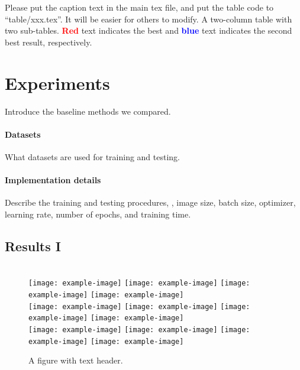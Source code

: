 \begin{table*}[t] \centering
    \newcommand{\Frst}[1]{\textcolor{red}{\textbf{#1}}}
    \newcommand{\Scnd}[1]{\textcolor{blue}{\textbf{#1}}}
    \caption{Please put the caption text in the main tex file, and put the table code to ``table/xxx.tex''. It will be easier for others to modify. A two-column table with two sub-tables. \Frst{Red} text indicates the best and \Scnd{blue} text indicates the second best result, respectively.}
    \label{tab:table2}
    
\end{table*}

\section{Experiments}%
\label{sec:Experiments}
Introduce the baseline methods we compared.

\paragraph{Datasets} What datasets are used for training and testing.

\paragraph{Implementation details} Describe the training and testing procedures, \eg, image size, batch size, optimizer, learning rate, number of epochs, and training time. 

\subsection{Results I}%
\label{sub:Results I}
\textcolor{lightgray}{\lipsum[1]}

\begin{figure}[t] \centering
    \\
    \texttt{[image: example-image]}
    \texttt{[image: example-image]}
    \texttt{[image: example-image]}
    \texttt{[image: example-image]}
    \\
    \texttt{[image: example-image]}
    \texttt{[image: example-image]}
    \texttt{[image: example-image]}
    \texttt{[image: example-image]}
    \\
    \texttt{[image: example-image]}
    \texttt{[image: example-image]}
    \texttt{[image: example-image]}
    \texttt{[image: example-image]}
    \\
    \caption{A figure with text header.} 
    \label{fig:figure3}
\end{figure}

